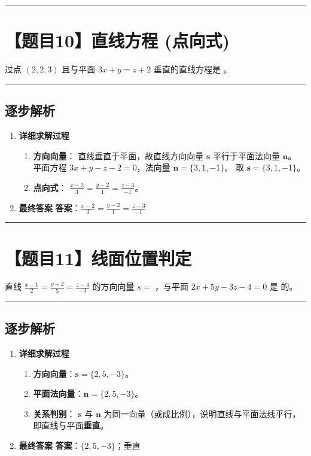 \documentclass[UTF8]{ctexart}
\newenvironment{redenv}{\color{red}}{}
\newenvironment{detailedanalysis}{%
    \color{red}
    \begin{enumerate}[label=\textbf{第\arabic*步：}, leftmargin=*, align=left, itemsep=1.5ex]
}{%
    \end{enumerate}
}
\newcommand{\problemrule}{\noindent\rule{\textwidth}{1.5pt}\vspace{-0.8em}}
\newcommand{\analysisrule}{\noindent\rule{\textwidth}{0.8pt}\vspace{-0.8em}}
\newcommand{\blank}[1]{\underline{\hspace{#1}}}
\begin{document}
\problemrule
\section*{【题目10】直线方程 (点向式)}
过点 $ (2,2,3) $ 且与平面 $ 3x + y = z + 2 $ 垂直的直线方程是 \blank{2cm}。

\begin{redenv}
\analysisrule
\subsection*{逐步解析}

\begin{detailedanalysis}
\item \textbf{详细求解过程}
\begin{enumerate}[label=(\arabic*)]
\item \textbf{方向向量}：
直线垂直于平面，故直线方向向量 $\mathbf{s}$ 平行于平面法向量 $\mathbf{n}$。
平面方程 $3x + y - z - 2 = 0$，法向量 $\mathbf{n} = \{3, 1, -1\}$。
取 $\mathbf{s} = \{3, 1, -1\}$。
\item \textbf{点向式}：
$\frac{x-2}{3} = \frac{y-2}{1} = \frac{z-3}{-1}$。
\end{enumerate}

\item \textbf{最终答案}
\textbf{答案}：$ \frac{x-2}{3} = \frac{y-2}{1} = \frac{z-3}{-1} $
\end{detailedanalysis}
\end{redenv}

\problemrule
\section*{【题目11】线面位置判定}
直线 $ \frac{x-1}{2} = \frac{y+2}{5} = \frac{z-4}{-3} $ 的方向向量 $s=$ \blank{1.5cm}，与平面 $ 2x + 5y - 3z - 4 = 0 $ 是 \blank{1.5cm} 的。

\begin{redenv}
\analysisrule
\subsection*{逐步解析}

\begin{detailedanalysis}
\item \textbf{详细求解过程}
\begin{enumerate}[label=(\arabic*)]
\item \textbf{方向向量}：$\mathbf{s} = \{2, 5, -3\}$。
\item \textbf{平面法向量}：$\mathbf{n} = \{2, 5, -3\}$。
\item \textbf{关系判别}：
$\mathbf{s}$ 与 $\mathbf{n}$ 为同一向量（或成比例），说明直线与平面法线平行，即直线与平面\textbf{垂直}。
\end{enumerate}

\item \textbf{最终答案}
\textbf{答案}：$ \{2, 5, -3\} $；垂直
\end{detailedanalysis}
\end{redenv}
\end{document}
